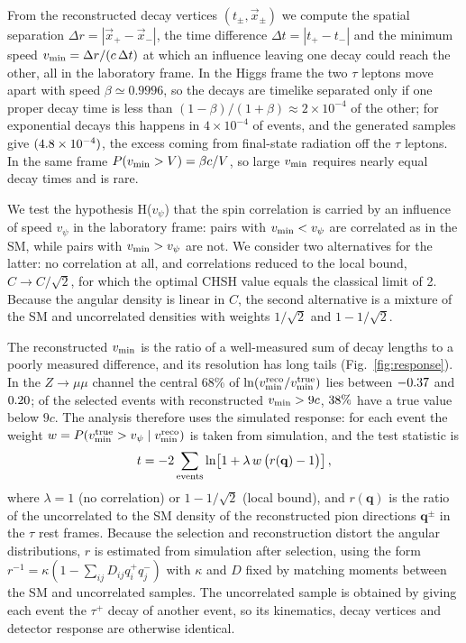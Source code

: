 \documentclass[%
 reprint,
 amsmath,amssymb,
 aps
]{revtex4-2}
\newcommand{\vpsi}{v_\psi}
\newcommand{\vmin}{v_{\rm min}}
\begin{document}
From the reconstructed decay vertices $(t_\pm, \vec{x}_\pm)$ we compute the spatial separation $\Delta r = |\vec{x}_+ - \vec{x}_-|$, the time difference $\Delta t = |t_+ - t_-|$ and the minimum speed $\vmin = \Delta r/(c\,\Delta t)$ at which an influence leaving one decay could reach the other, all in the laboratory frame. In the Higgs frame the two $\tau$ leptons move apart with speed $\beta\simeq 0.9996$, so the decays are timelike separated only if one proper decay time is less than $(1-\beta)/(1+\beta)\approx 2\times10^{-4}$ of the other; for exponential decays this happens in $4\times10^{-4}$ of events, and the generated samples give $(4.8\times10^{-4})$, the excess coming from final-state radiation off the $\tau$ leptons. In the same frame $P(\vmin>V)=\beta c/V$, so large $\vmin$ requires nearly equal decay times and is rare.

We test the hypothesis H($\vpsi$) that the spin correlation is carried by an influence of speed $\vpsi$ in the laboratory frame: pairs with $\vmin<\vpsi$ are correlated as in the SM, while pairs with $\vmin>\vpsi$ are not. We consider two alternatives for the latter: no correlation at all, and correlations reduced to the local bound, $C\to C/\sqrt2$, for which the optimal CHSH value equals the classical limit of 2. Because the angular density is linear in $C$, the second alternative is a mixture of the SM and uncorrelated densities with weights $1/\sqrt2$ and $1-1/\sqrt2$.

The reconstructed $\vmin$ is the ratio of a well-measured sum of decay lengths to a poorly measured difference, and its resolution has long tails (Fig.~\ref{fig:response}). In the $Z\to\mu\mu$ channel the central 68\% of $\ln(\vmin^{\rm reco}/\vmin^{\rm true})$ lies between $-0.37$ and $0.20$; of the selected events with reconstructed $\vmin>9c$, $38\%$ have a true value below $9c$. The analysis therefore uses the simulated response: for each event the weight $w=P(\vmin^{\rm true}>\vpsi\mid\vmin^{\rm reco})$ is taken from simulation, and the test statistic is
\begin{equation}
  t = -2\sum_{\rm events}\ln\!\left[1+\lambda\,w\,\big(r(\mathbf{q})-1\big)\right],
\end{equation}
where $\lambda=1$ (no correlation) or $1-1/\sqrt2$ (local bound), and $r(\mathbf{q})$ is the ratio of the uncorrelated to the SM density of the reconstructed pion directions $\mathbf{q}^\pm$ in the $\tau$ rest frames. Because the selection and reconstruction distort the angular distributions, $r$ is estimated from simulation after selection, using the form $r^{-1}=\kappa(1-\sum_{ij}D_{ij}q^+_iq^-_j)$ with $\kappa$ and $D$ fixed by matching moments between the SM and uncorrelated samples. The uncorrelated sample is obtained by giving each event the $\tau^+$ decay of another event, so its kinematics, decay vertices and detector response are otherwise identical.
\end{document}
